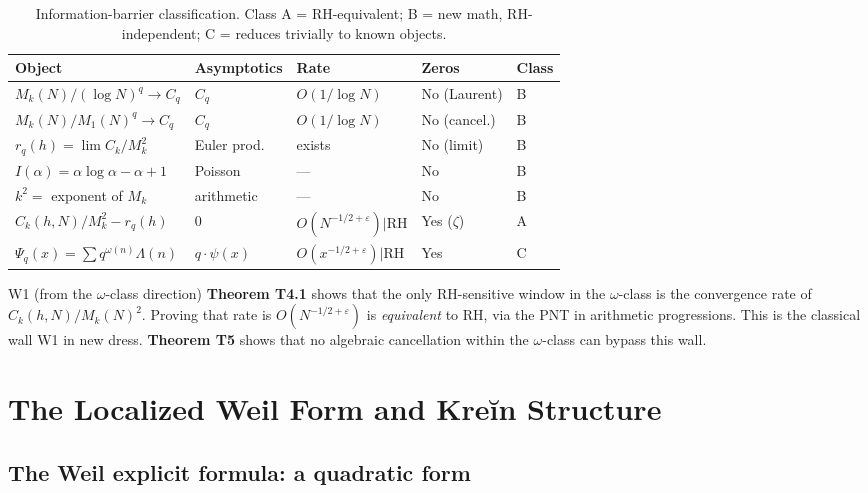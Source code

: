 \documentclass[11pt]{amsart}
\theoremstyle{definition}
\theoremstyle{remark}
\newcommand{\om}{\omega}
\newcommand{\Lam}{\Lambda}
\newcommand{\eps}{\varepsilon}
\begin{document}
\begin{table}[h]
\centering
\renewcommand{\arraystretch}{1.4}
\begin{tabular}{lllll}
\toprule
Object & Asymptotics & Rate & Zeros & Class \\
\midrule
$M_k(N)/(\log N)^q \to C_q$ & $C_q$ & $O(1/\log N)$ & No (Laurent) & B \\
$M_k(N)/M_1(N)^q \to C_q$ & $C_q$ & $O(1/\log N)$ & No (cancel.) & B \\
$r_q(h)=\lim C_k/M_k^2$ & Euler prod. & exists & No (limit) & B \\
$I(\alpha)=\alpha\log\alpha-\alpha+1$ & Poisson & --- & No & B \\
$k^2 = $ exponent of $M_k$ & arithmetic & --- & No & B \\
$C_k(h,N)/M_k^2 - r_q(h)$ & 0 & $O(N^{-1/2+\eps})|$RH & Yes ($\zeta$) & A \\
$\Psi_q(x) = \sum q^{\om(n)}\Lam(n)$ & $q\cdot\psi(x)$ & $O(x^{-1/2+\eps})|$RH & Yes & C \\
\bottomrule
\end{tabular}
\caption{Information-barrier classification. Class A = RH-equivalent; B = new
math, RH-independent; C = reduces trivially to known objects.}
\label{tab:omega-class}
\end{table}

\begin{wallbox}{W1 (from the $\omega$-class direction)}
\textbf{Theorem T4.1} shows that the only RH-sensitive window in the $\om$-class is
the convergence rate of $C_k(h,N)/M_k(N)^2$.  Proving that rate is $O(N^{-1/2+\eps})$
is \emph{equivalent} to RH, via the PNT in arithmetic progressions.  This is the
classical wall W1 in new dress.  \textbf{Theorem T5} shows that no algebraic
cancellation within the $\om$-class can bypass this wall.
\end{wallbox}

\section{The Localized Weil Form and Kreĭn Structure}
\label{sec:Weil}

\subsection{The Weil explicit formula: a quadratic form}
\label{ss:Weil}
\end{document}

